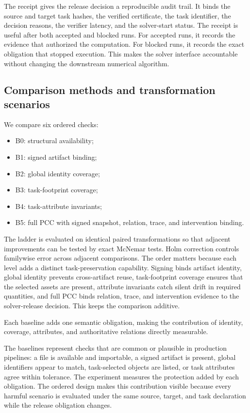\documentclass[preprint,12pt]{elsarticle}
\begin{document}
The receipt gives the release decision a reproducible audit trail. It binds the source and target task hashes, the verified certificate, the task identifier, the decision reasons, the verifier latency, and the solver-start status. The receipt is useful after both accepted and blocked runs. For accepted runs, it records the evidence that authorized the computation. For blocked runs, it records the exact obligation that stopped execution. This makes the solver interface accountable without changing the downstream numerical algorithm.

\subsection{Comparison methods and transformation scenarios}

We compare six ordered checks:

\begin{itemize}
\item B0: structural availability;
\item B1: signed artifact binding;
\item B2: global identity coverage;
\item B3: task-footprint coverage;
\item B4: task-attribute invariants;
\item B5: full PCC with signed snapshot, relation, trace, and intervention binding.
\end{itemize}

The ladder is evaluated on identical paired transformations so that adjacent improvements can be tested by exact McNemar tests. Holm correction controls familywise error across adjacent comparisons.
The order matters because each level adds a distinct task-preservation capability. Signing binds artifact identity, global identity prevents cross-artifact reuse, task-footprint coverage ensures that the selected assets are present, attribute invariants catch silent drift in required quantities, and full PCC binds relation, trace, and intervention evidence to the solver-release decision. This keeps the comparison additive.

Each baseline adds one semantic obligation, making the contribution of identity, coverage, attributes, and authoritative relations directly measurable.

The baselines represent checks that are common or plausible in production pipelines: a file is available and importable, a signed artifact is present, global identifiers appear to match, task-selected objects are listed, or task attributes agree within tolerance. The experiment measures the protection added by each obligation. The ordered design makes this contribution visible because every harmful scenario is evaluated under the same source, target, and task declaration while the release obligation changes.
\end{document}
